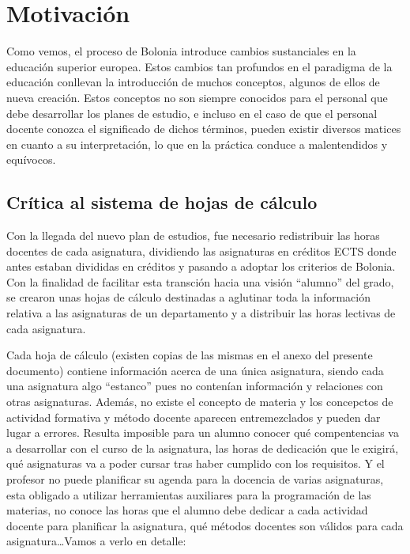 \section{Motivación}

	Como vemos, el proceso de Bolonia introduce cambios sustanciales en la educación superior europea. Estos cambios tan profundos en el paradigma de la educación conllevan la introducción de muchos conceptos, algunos de ellos de nueva creación. Estos conceptos no son siempre conocidos para el personal que debe desarrollar los planes de estudio, e incluso en el caso de que el personal docente conozca el significado de dichos términos, pueden existir diversos matices en cuanto a su interpretación, lo que en la práctica conduce a malentendidos y equívocos. 
  	
		\subsection{Crítica al sistema de hojas de cálculo}
		Con la llegada del nuevo plan de estudios, fue necesario redistribuir las horas docentes de cada asignatura, dividiendo las asignaturas en créditos ECTS donde antes estaban divididas en créditos y pasando a adoptar los criterios de Bolonia. Con la finalidad de facilitar esta transción hacia una visión "`alumno"' del grado, se crearon unas hojas de cálculo destinadas a aglutinar toda la información relativa a las asignaturas de un departamento y a distribuir las horas lectivas de cada asignatura. 
      
		Cada hoja de cálculo (existen copias de las mismas en el anexo del presente documento)  contiene información acerca de una única asignatura, siendo cada una asignatura algo "`estanco"' pues no contenían información y relaciones con otras asignaturas. Además, no existe el concepto de materia y los concepctos de actividad formativa y método docente aparecen entremezclados y pueden dar lugar a errores. Resulta imposible para un alumno conocer qué compentencias va a desarrollar con el curso de la asignatura, las horas de dedicación que le exigirá, qué asignaturas va a poder cursar tras haber cumplido con los requisitos. Y el profesor no puede planificar su agenda para la docencia de varias asignaturas, esta obligado a utilizar herramientas auxiliares para la programación de las materias, no conoce las horas que el alumno debe dedicar a cada actividad docente para planificar la asignatura, qué métodos docentes son válidos para cada asignatura\ldots Vamos a verlo en detalle:
      
